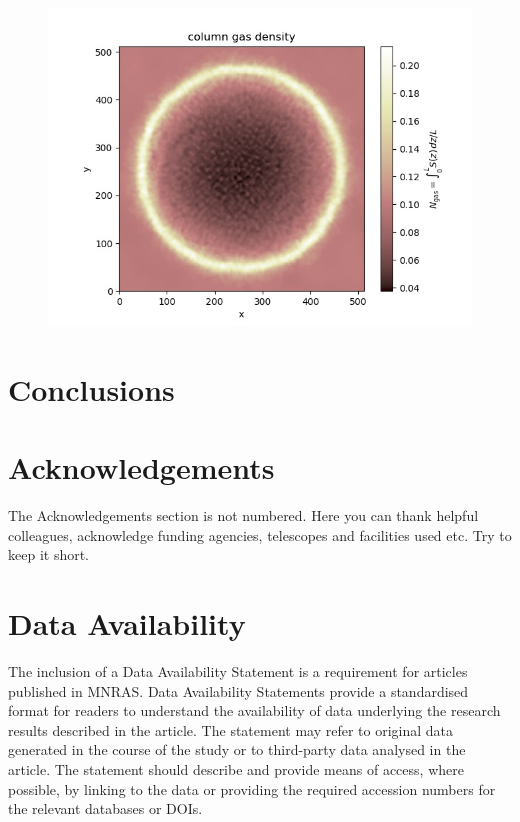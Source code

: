 \documentclass[fleqn,usenatbib]{mnras}
\begin{document}
\begin{figure}
{      \includegraphics{3Dsedov_SN_dust_newsetup2_10pc_chi4_512_FGupd_new_n01_uin2_column_gasVAR20.jpg}}

  \caption{\label{3Dsedov} }
  \end{figure}   

\section{Conclusions}


\section*{Acknowledgements}

The Acknowledgements section is not numbered. Here you can thank helpful
colleagues, acknowledge funding agencies, telescopes and facilities used etc.
Try to keep it short.

\section*{Data Availability}

 
The inclusion of a Data Availability Statement is a requirement for articles published in MNRAS. Data Availability Statements provide a standardised format for readers to understand the availability of data underlying the research results described in the article. The statement may refer to original data generated in the course of the study or to third-party data analysed in the article. The statement should describe and provide means of access, where possible, by linking to the data or providing the required accession numbers for the relevant databases or DOIs.
\end{document}
